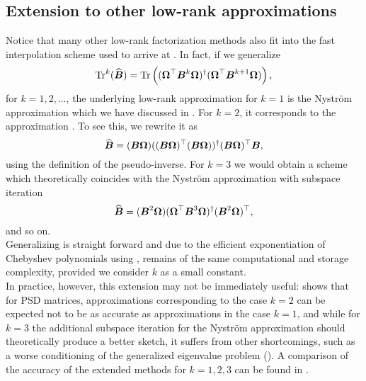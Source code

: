 
\subsection{Extension to other low-rank approximations}
\label{subsec:3-nystrom-other-low-rank}

Notice that many other low-rank factorization methods \cite{halko2011finding,tropp2023randomized}
also fit into the fast interpolation scheme used to arrive at .
In fact, if we generalize
\begin{equation}
    \operatorname{Tr}^{k}(\widehat{\boldsymbol{B}})
        = \operatorname{Tr}\left((\boldsymbol{\Omega}^{\top} \boldsymbol{B}^k \boldsymbol{\Omega})^{\dagger} (\boldsymbol{\Omega}^{\top} \boldsymbol{B}^{k+1} \boldsymbol{\Omega}) \right),
    \label{equ:3-nystrom-trace-generalization}
\end{equation}
for $k=1, 2, \dots$,
the underlying low-rank approximation for $k=1$ is the Nystr\"om approximation
which we have discussed in .
For $k=2$, it corresponds to the approximation .
To see this, we rewrite it as
\begin{equation}
    \widehat{\boldsymbol{B}} = (\boldsymbol{B} \boldsymbol{\Omega}) ((\boldsymbol{B} \boldsymbol{\Omega})^{\top} (\boldsymbol{B} \boldsymbol{\Omega}))^{\dagger} (\boldsymbol{B} \boldsymbol{\Omega})^{\top} \boldsymbol{B},
    \label{equ:3-nystrom-RSVD-rewritten}
\end{equation}
using the definition of the pseudo-inverse.
For $k=3$ we would obtain a scheme which theoretically coincides with the Nystr\"om
approximation with subspace iteration \cite{tropp2023randomized}
\begin{equation}
    \widehat{\boldsymbol{B}} = (\boldsymbol{B}^2 \boldsymbol{\Omega}) (\boldsymbol{\Omega}^{\top} \boldsymbol{B}^3 \boldsymbol{\Omega})^{\dagger} (\boldsymbol{B}^2 \boldsymbol{\Omega})^{\top},
    \label{equ:3-nystrom-nystrom-SI}
\end{equation}
and so on.\\

Generalizing  is straight forward and
due to the efficient exponentiation of Chebyshev polynomials using
, remains of the same
computational and storage complexity, provided we consider $k$ as a small constant.\\

In practice, however, this extension may not be immediately useful: \cite[lemma~5.2]{tropp2023randomized}
shows that for \gls{PSD} matrices, approximations corresponding to the case $k=2$
can be expected not to be as accurate as approximations in the case $k=1$, and
while for $k=3$ the additional subspace iteration for the Nystr\"om approximation
should theoretically produce a better sketch, it suffers from other shortcomings,
such as a worse conditioning of the generalized eigenvalue problem ().
A comparison of the accuracy of the extended methods for $k=1, 2, 3$ can be
found in .

